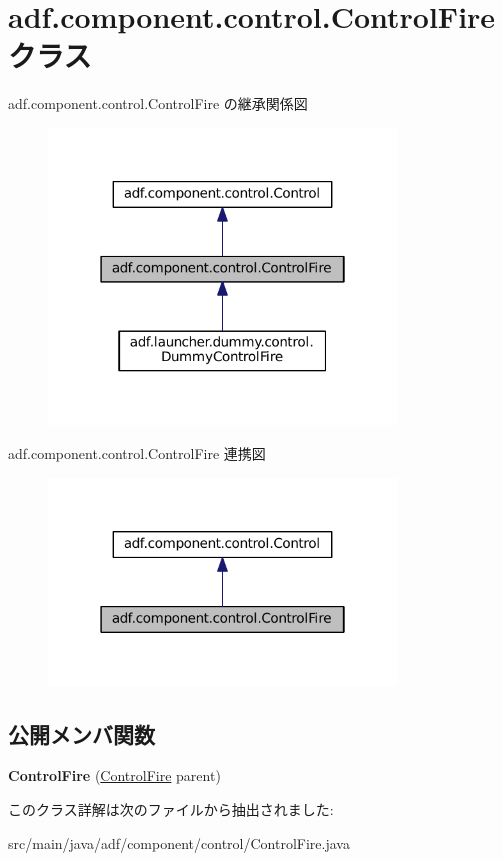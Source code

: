 \hypertarget{classadf_1_1component_1_1control_1_1ControlFire}{}\section{adf.\+component.\+control.\+Control\+Fire クラス}
\label{classadf_1_1component_1_1control_1_1ControlFire}


adf.\+component.\+control.\+Control\+Fire の継承関係図
\nopagebreak
\begin{figure}[H]
\begin{center}
\leavevmode
\includegraphics[width=262pt]{classadf_1_1component_1_1control_1_1ControlFire__inherit__graph}
\end{center}
\end{figure}


adf.\+component.\+control.\+Control\+Fire 連携図
\nopagebreak
\begin{figure}[H]
\begin{center}
\leavevmode
\includegraphics[width=262pt]{classadf_1_1component_1_1control_1_1ControlFire__coll__graph}
\end{center}
\end{figure}
\subsection*{公開メンバ関数}
\begin{DoxyCompactItemize}
\item 
\hypertarget{classadf_1_1component_1_1control_1_1ControlFire_a868120301fcf4b970ef05401798baca6}{}\label{classadf_1_1component_1_1control_1_1ControlFire_a868120301fcf4b970ef05401798baca6} 
{\bfseries Control\+Fire} (\hyperlink{classadf_1_1component_1_1control_1_1ControlFire}{Control\+Fire} parent)
\end{DoxyCompactItemize}


このクラス詳解は次のファイルから抽出されました\+:\begin{DoxyCompactItemize}
\item 
src/main/java/adf/component/control/Control\+Fire.\+java\end{DoxyCompactItemize}
